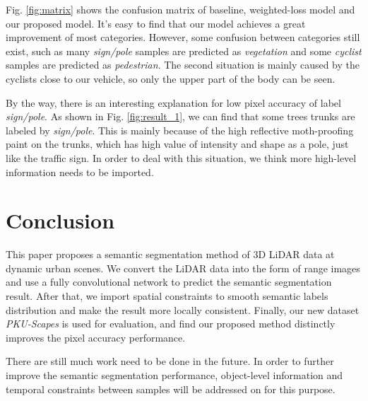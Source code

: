 Fig. \ref{fig:matrix} shows the confusion matrix of baseline, weighted-loss model and our proposed model. It's easy to find that our model achieves a great improvement of most categories. However, some confusion between categories still exist, such as many \textit{sign/pole} samples are predicted as \textit{vegetation} and some \textit{cyclist} samples are predicted as \textit{pedestrian}. The second situation is mainly caused by the cyclists close to our vehicle, so only the upper part of the body can be seen.

By the way, there is an interesting explanation for low pixel accuracy of label \textit{sign/pole}. As shown in Fig. \ref{fig:result_1}, we can find that some trees trunks are labeled by \textit{sign/pole}. This is mainly because of the high reflective moth-proofing paint on the trunks, which has high value of intensity and shape as a pole, just like the traffic sign. In order to deal with this situation, we think more high-level information needs to be imported.


\section{Conclusion}
This paper proposes a semantic segmentation method of 3D LiDAR data at dynamic urban scenes. We convert the LiDAR data into the form of range images and use a fully convolutional network to predict the semantic segmentation result. After that, we import spatial constraints to smooth semantic labels distribution and make the result more locally consistent. Finally, our new dataset \textit{PKU-Scapes} is used for evaluation, and find our proposed method distinctly improves the pixel accuracy performance.

There are still much work need to be done in the future. In order to further improve the semantic segmentation performance, object-level information and temporal constraints between samples will be addressed on for this purpose.


	


	
	

